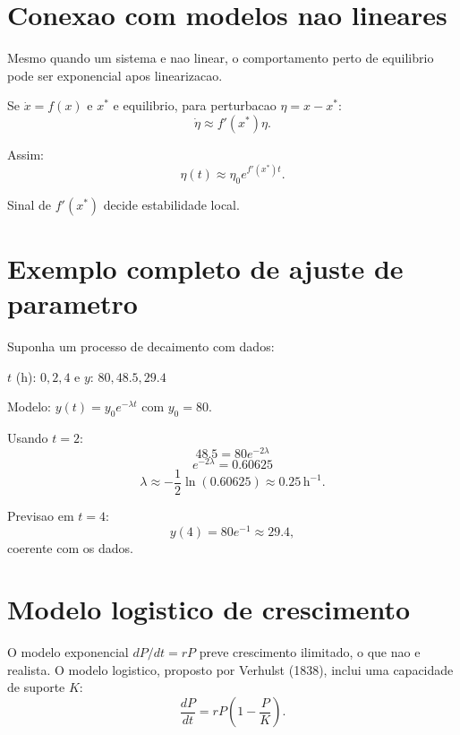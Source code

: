 \documentclass[12pt,a4paper,oneside]{book}
\theoremstyle{definition}
\begin{document}
\section{Conexao com modelos nao lineares}

Mesmo quando um sistema e nao linear, o comportamento perto de equilibrio pode ser exponencial apos linearizacao.

Se $\dot{x}=f(x)$ e $x^*$ e equilibrio, para perturbacao $\eta=x-x^*$:
\begin{equation}
\dot{\eta}\approx f'(x^*)\eta.
\end{equation}

Assim:
\begin{equation}
\eta(t)\approx \eta_0e^{f'(x^*)t}.
\end{equation}

Sinal de $f'(x^*)$ decide estabilidade local.

\section{Exemplo completo de ajuste de parametro}

Suponha um processo de decaimento com dados:
\begin{center}
$t$ (h): $0, 2, 4$ \quad e \quad $y$: $80, 48.5, 29.4$
\end{center}

Modelo: $y(t)=y_0e^{-\lambda t}$ com $y_0=80$.

Usando $t=2$:
\begin{equation}
48.5 = 80e^{-2\lambda}
\end{equation}
\begin{equation}
e^{-2\lambda}=0.60625
\end{equation}
\begin{equation}
\lambda\approx -\frac{1}{2}\ln(0.60625)\approx 0.25\,\text{h}^{-1}.
\end{equation}

Previsao em $t=4$:
\begin{equation}
y(4)=80e^{-1}\approx 29.4,
\end{equation}
coerente com os dados.

\section{Modelo logistico de crescimento}

O modelo exponencial $dP/dt = rP$ preve crescimento ilimitado, o que nao e realista.
O modelo logistico, proposto por Verhulst (1838), inclui uma capacidade de suporte $K$:
\begin{equation}
\frac{dP}{dt} = rP\!\left(1 - \frac{P}{K}\right).
\end{equation}
\end{document}
